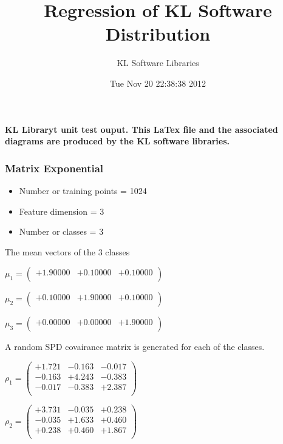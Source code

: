 \documentclass[12pt]{article}
\theoremstyle{definition}
\theoremstyle{remark}
\numberwithin{equation}{section}
\begin{document}
\title{Regression of KL Software Distribution   }
\author{KL Software Libraries}
\date{Tue Nov 20 22:38:38 2012
}
\maketitle
\textbf{ KL Libraryt unit test ouput.  This LaTex file and the associated diagrams 		are produced by the KL software libraries.}
\subsubsection{Matrix Exponential }
\begin{itemize}
\item Number or training points = 1024
\item Feature dimension = 3
\item Number or classes = 3
\end{itemize}
{The mean vectors of the 3 classes}

$\mu_1 = \left(
\begin{array}{
ccc}
+1.90000 & +0.10000 & +0.10000 \\
\end{array}
\right)$

$\mu_2 = \left(
\begin{array}{
ccc}
+0.10000 & +1.90000 & +0.10000 \\
\end{array}
\right)$

$\mu_3 = \left(
\begin{array}{
ccc}
+0.00000 & +0.00000 & +1.90000 \\
\end{array}
\right)$

A random SPD covairance matrix is generated for each of the classes.\newline

$\rho_1 = \left(
\begin{array}{
ccc}
+1.721 & -0.163 & -0.017 \\
-0.163 & +4.243 & -0.383 \\
-0.017 & -0.383 & +2.387 \\
\end{array}
\right)$

$\rho_2 = \left(
\begin{array}{
ccc}
+3.731 & -0.035 & +0.238 \\
-0.035 & +1.633 & +0.460 \\
+0.238 & +0.460 & +1.867 \\
\end{array}
\right)$
\end{document}
